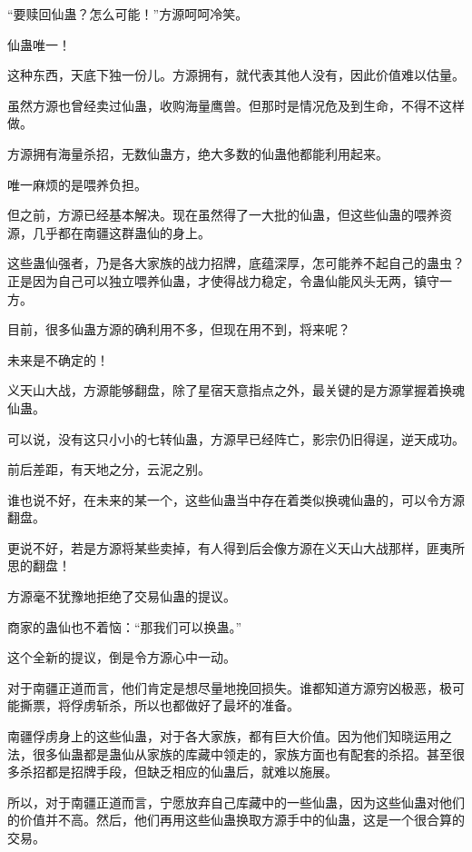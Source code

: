 
\begin{this_body}



“要赎回仙蛊？怎么可能！”方源呵呵冷笑。

仙蛊唯一！

这种东西，天底下独一份儿。方源拥有，就代表其他人没有，因此价值难以估量。

虽然方源也曾经卖过仙蛊，收购海量鹰兽。但那时是情况危及到生命，不得不这样做。

方源拥有海量杀招，无数仙蛊方，绝大多数的仙蛊他都能利用起来。

唯一麻烦的是喂养负担。

但之前，方源已经基本解决。现在虽然得了一大批的仙蛊，但这些仙蛊的喂养资源，几乎都在南疆这群蛊仙的身上。

这些蛊仙强者，乃是各大家族的战力招牌，底蕴深厚，怎可能养不起自己的蛊虫？正是因为自己可以独立喂养仙蛊，才使得战力稳定，令蛊仙能风头无两，镇守一方。

目前，很多仙蛊方源的确利用不多，但现在用不到，将来呢？

未来是不确定的！

义天山大战，方源能够翻盘，除了星宿天意指点之外，最关键的是方源掌握着换魂仙蛊。

可以说，没有这只小小的七转仙蛊，方源早已经阵亡，影宗仍旧得逞，逆天成功。

前后差距，有天地之分，云泥之别。

谁也说不好，在未来的某一个，这些仙蛊当中存在着类似换魂仙蛊的，可以令方源翻盘。

更说不好，若是方源将某些卖掉，有人得到后会像方源在义天山大战那样，匪夷所思的翻盘！

方源毫不犹豫地拒绝了交易仙蛊的提议。

商家的蛊仙也不着恼：“那我们可以换蛊。”

这个全新的提议，倒是令方源心中一动。

对于南疆正道而言，他们肯定是想尽量地挽回损失。谁都知道方源穷凶极恶，极可能撕票，将俘虏斩杀，所以也都做好了最坏的准备。

南疆俘虏身上的这些仙蛊，对于各大家族，都有巨大价值。因为他们知晓运用之法，很多仙蛊都是蛊仙从家族的库藏中领走的，家族方面也有配套的杀招。甚至很多杀招都是招牌手段，但缺乏相应的仙蛊后，就难以施展。

所以，对于南疆正道而言，宁愿放弃自己库藏中的一些仙蛊，因为这些仙蛊对他们的价值并不高。然后，他们再用这些仙蛊换取方源手中的仙蛊，这是一个很合算的交易。


\end{this_body}
